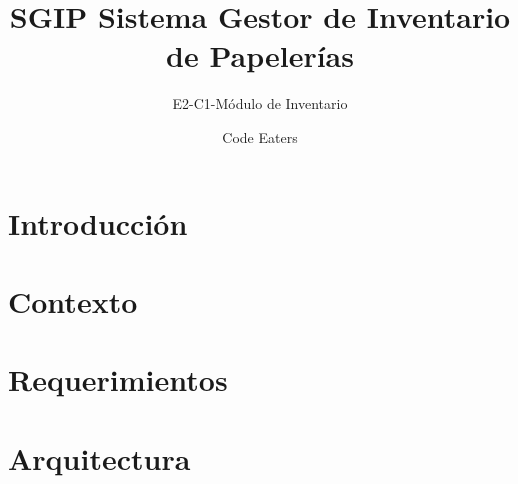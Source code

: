 \documentclass[11pt]{book}
\title{SGIP Sistema Gestor de Inventario de Papelerías}
\author{Code Eaters}
\subtitle{E2-C1-Módulo de Inventario}
\date{}
\begin{document}
\maketitle
{}
\makeProjectCharter
\newpage
\makeFirmas
\tableofcontents

\chapter{Introducción}
\label{ch:Introduccion}


\chapter{Contexto}
\label{ch:Contexto}


\chapter{Requerimientos}
\label{ch:Requerimientos}


\chapter{Arquitectura}
\label{ch:Arquitectura}

\end{document}

